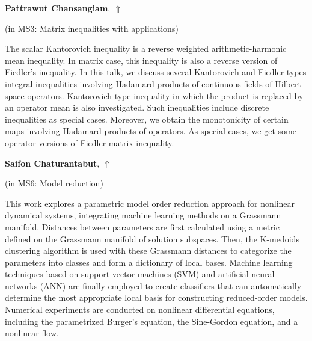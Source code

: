 \documentclass[ILAS2025-program.tex]{subfiles}
\begin{document}
\hypertarget{down0145}{}\begin{ilasabstract}
    
\textbf{Pattrawut Chansangiam},  \hfill \hyperlink{up0145}{$\Uparrow$}
    
    
(in {\color{mstitle}MS3: Matrix inequalities with applications})
        
\mtskip
    The scalar Kantorovich inequality is a reverse weighted arithmetic-harmonic mean
inequality. In matrix case, this inequality is also a reverse version of Fiedler’s inequality. In
this talk, we discuss several Kantorovich and Fiedler types integral inequalities involving
Hadamard products of continuous fields of Hilbert space operators. Kantorovich type inequality
in which the product is replaced by an operator mean is also investigated. Such inequalities
include discrete inequalities as special cases. Moreover, we obtain the monotonicity of certain
maps involving Hadamard products of operators. As special cases, we get some operator versions of Fiedler matrix inequality.

\end{ilasabstract}
    

\hypertarget{down0129}{}\begin{ilasabstract}
    
\textbf{Saifon Chaturantabut},  \hfill \hyperlink{up0129}{$\Uparrow$}
    
    
(in {\color{mstitle}MS6: Model reduction})
        
\mtskip
    This work explores a parametric model order reduction approach for nonlinear dynamical systems, integrating machine learning methods on a Grassmann manifold. Distances between parameters are first calculated using a metric defined on the Grassmann manifold of solution subspaces. Then, the K-medoids clustering algorithm is used with these Grassmann distances to categorize the parameters into classes and form a dictionary of local bases. Machine learning techniques based on support vector machines (SVM) and artificial neural networks (ANN) are finally employed to create classifiers that can automatically determine the most appropriate local basis for constructing reduced-order models. Numerical experiments are conducted on nonlinear differential equations, including the parametrized Burger's equation, the Sine-Gordon equation, and a nonlinear flow.

\end{ilasabstract}
    
\end{document}
